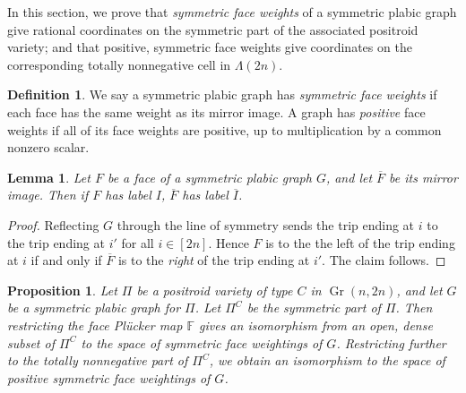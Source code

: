 \documentclass[10pt]{amsart}
\newtheorem{lemm}[theo]{Lemma}
\newtheorem{prop}[theo]{Proposition}
\theoremstyle{definition}
\newtheorem{defi}[theo]{Definition}
\DeclareMathOperator{\Gr}{Gr}
\newcommand{\Lm}{\Lambda}
\begin{document}
In this section, we prove that \emph{symmetric face weights} of a symmetric plabic graph give rational coordinates on the symmetric part of the associated positroid variety; and that positive, symmetric face weights give coordinates on the corresponding totally nonnegative cell in $\Lm(2n)$.

\begin{defi}We say a symmetric plabic graph has \emph{symmetric face weights} if each face has the same weight as its mirror image. A graph has \emph{positive} face weights if all of its face weights are positive, up to multiplication by a common nonzero scalar.
\end{defi}

\begin{lemm}\label{mirror}
Let $F$ be a face of a symmetric plabic graph $G$, and let $\overline{F}$ be its mirror image. Then if $F$ has label $I$, $\overline{F}$ has label $\overline{I}$.
\end{lemm}

\begin{proof}
Reflecting $G$ through the line of symmetry sends the trip ending at $i$ to the trip ending at $i'$ for all $i \in [2n]$. Hence $F$ is to the the left of the trip ending at $i$ if and only if $\overline{F}$ is to the \emph{right} of the trip ending at $i'$. The claim follows. \end{proof}



\begin{prop}
\label{sym_face_weights}
Let $\Pi$ be a positroid variety of type $C$ in $\Gr(n,2n)$, and let $G$ be a symmetric plabic graph for $\Pi$. Let $\Pi^C$ be the symmetric part of $\Pi$. Then restricting the face Pl{\"u}cker map $\mathbb{F}$ gives an isomorphism from an open, dense subset of $\Pi^C$ to the space of symmetric face weightings of $G$. Restricting further to the totally nonnegative part of $\Pi^C$, we obtain an isomorphism to the space of \emph{positive} symmetric face weightings of $G$.
\end{prop}
\end{document}

